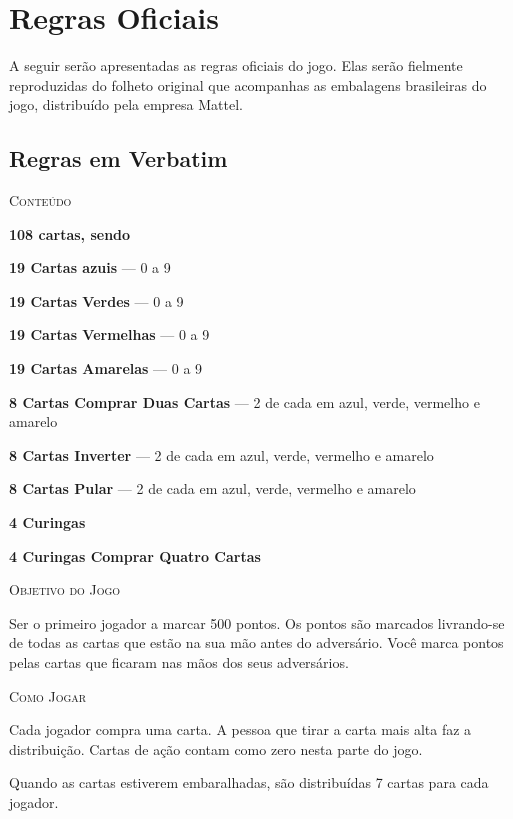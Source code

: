 \section{Regras Oficiais}

A seguir serão apresentadas as regras oficiais do jogo. Elas serão fielmente reproduzidas do folheto original que acompanhas as embalagens brasileiras do jogo, distribuído pela empresa Mattel. 

\subsection{Regras em Verbatim}

\vspace{0.5cm}

\textsc{\large{Conteúdo}}

\textbf{108 cartas, sendo}

\textbf{19 Cartas azuis} --- 0 a 9

\textbf{19 Cartas Verdes} --- 0 a 9

\textbf{19 Cartas Vermelhas} --- 0 a 9

\textbf{19 Cartas Amarelas} --- 0 a 9

\textbf{8 Cartas Comprar Duas Cartas} --- 2 de cada em azul, verde, vermelho e amarelo

\textbf{8 Cartas Inverter} --- 2 de cada em azul, verde, vermelho e amarelo

\textbf{8 Cartas Pular} --- 2 de cada em azul, verde, vermelho e amarelo

\textbf{4 Curingas}

\textbf{4 Curingas Comprar Quatro Cartas}

\vspace{0.5cm}

\textsc{\large{Objetivo do Jogo}}

Ser o primeiro jogador a marcar 500 pontos. Os pontos são marcados livrando-se de todas as cartas que estão na sua mão antes do adversário. Você marca pontos pelas cartas que ficaram nas mãos dos seus adversários.

\vspace{0.5cm}

\textsc{\large{Como Jogar}}

Cada jogador compra uma carta. A pessoa que tirar a carta mais alta faz a distribuição. Cartas de ação contam como zero nesta parte do jogo.

Quando as cartas estiverem embaralhadas, são distribuídas 7 cartas para cada jogador.

